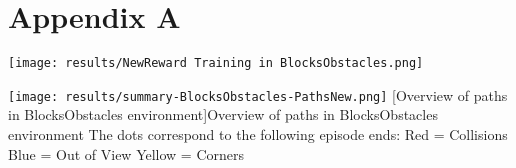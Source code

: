 \appendix
\section{Appendix A} \label{appendixA}


\begin{Figure}
    \centering
    \texttt{[image: results/NewReward Training in BlocksObstacles.png]}
    \label{im:NewRewardTraining}
\end{Figure}


\begin{SCfigure}
    \centering
    \texttt{[image: results/summary-BlocksObstacles-PathsNew.png]}
    [Overview of paths in BlocksObstacles environment]{Overview of paths in BlocksObstacles environment\newline\newline\newline\newline\newline\newline\newline\newline\newline\newline\newline\newline\newline\newline\newline\newline\newline
    The dots correspond to the following episode ends: \newline
    Red = Collisions\newline
    Blue = Out of View \newline
    Yellow = Corners}
    \label{im:ObstaclePaths}
\end{SCfigure}



